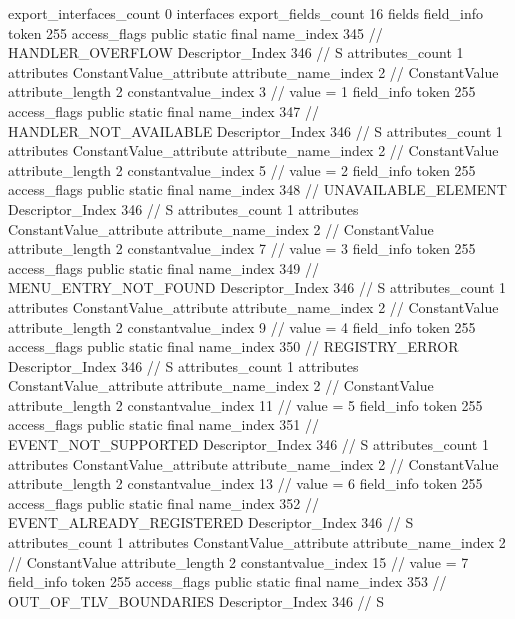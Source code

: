 {{{{			}
			export_interfaces_count	0
			interfaces {
			}
			export_fields_count	16
			fields {
			field_info {
				token	255
				access_flags	public static final
				name_index	345		// HANDLER_OVERFLOW
				Descriptor_Index	346		// S
				attributes_count	1
				attributes {
				ConstantValue_attribute {
					attribute_name_index	2		// ConstantValue
					attribute_length	2
					constantvalue_index	3		// value = 1
				}
				}
			}
			field_info {
				token	255
				access_flags	public static final
				name_index	347		// HANDLER_NOT_AVAILABLE
				Descriptor_Index	346		// S
				attributes_count	1
				attributes {
				ConstantValue_attribute {
					attribute_name_index	2		// ConstantValue
					attribute_length	2
					constantvalue_index	5		// value = 2
				}
				}
			}
			field_info {
				token	255
				access_flags	public static final
				name_index	348		// UNAVAILABLE_ELEMENT
				Descriptor_Index	346		// S
				attributes_count	1
				attributes {
				ConstantValue_attribute {
					attribute_name_index	2		// ConstantValue
					attribute_length	2
					constantvalue_index	7		// value = 3
				}
				}
			}
			field_info {
				token	255
				access_flags	public static final
				name_index	349		// MENU_ENTRY_NOT_FOUND
				Descriptor_Index	346		// S
				attributes_count	1
				attributes {
				ConstantValue_attribute {
					attribute_name_index	2		// ConstantValue
					attribute_length	2
					constantvalue_index	9		// value = 4
				}
				}
			}
			field_info {
				token	255
				access_flags	public static final
				name_index	350		// REGISTRY_ERROR
				Descriptor_Index	346		// S
				attributes_count	1
				attributes {
				ConstantValue_attribute {
					attribute_name_index	2		// ConstantValue
					attribute_length	2
					constantvalue_index	11		// value = 5
				}
				}
			}
			field_info {
				token	255
				access_flags	public static final
				name_index	351		// EVENT_NOT_SUPPORTED
				Descriptor_Index	346		// S
				attributes_count	1
				attributes {
				ConstantValue_attribute {
					attribute_name_index	2		// ConstantValue
					attribute_length	2
					constantvalue_index	13		// value = 6
				}
				}
			}
			field_info {
				token	255
				access_flags	public static final
				name_index	352		// EVENT_ALREADY_REGISTERED
				Descriptor_Index	346		// S
				attributes_count	1
				attributes {
				ConstantValue_attribute {
					attribute_name_index	2		// ConstantValue
					attribute_length	2
					constantvalue_index	15		// value = 7
				}
				}
			}
			field_info {
				token	255
				access_flags	public static final
				name_index	353		// OUT_OF_TLV_BOUNDARIES
				Descriptor_Index	346		// S
}}}}}
